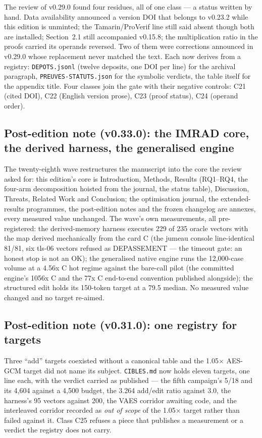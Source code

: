 \documentclass[10pt,a4paper]{article}
\newcommand{\code}[1]{\texttt{\small #1}}
\begin{document}
The review of v0.29.0 found four residues, all of one class --- a status written by hand. Data
availability announced a version DOI that belongs to v0.23.2 while this edition is unminted; the
Tamarin/ProVerif line still said absent though both are installed; Section~2.1 still accompanied
v0.15.8; the multiplication ratio in the proofs carried its operands reversed. Two of them were
corrections announced in v0.29.0 whose replacement never matched the text. Each now derives from
a registry: \code{DEPOTS.jsonl} (twelve deposits, one DOI per line) for the archival paragraph,
\code{PREUVES-STATUTS.json} for the symbolic verdicts, the table itself for the appendix title.
Four classes join the gate with their negative controls: C21 (cited DOI), C22 (English version
prose), C23 (proof status), C24 (operand order).


\subsection{Post-edition note (v0.33.0): the IMRAD core, the derived
harness, the generalised engine}
The twenty-eighth wave restructures the manuscript into the core the
review asked for: this edition's core is Introduction, Methods, Results
(RQ1--RQ4, the four-arm decomposition hoisted from the journal, the
status table), Discussion, Threats, Related Work and Conclusion; the
optimisation journal, the extended-results programmes, the post-edition
notes and the frozen changelog are annexes, every measured value
unchanged. The wave's own measurements, all pre-registered: the
derived-memory harness executes 229 of 235 oracle vectors with the map
derived mechanically from the card C (the jumeau console line-identical
81/81, six tls-06 vectors refused as DEPASSEMENT --- the timeout gate:
an honest stop is not an OK); the generalised native engine runs the
12,000-case volume at a 4.56x C hot regime against the bare-call pilot
(the committed engine's 1056x C and the 77x C end-to-end convention
published alongside); the structured edit holds its 150-token target at
a 79.5 median. No measured value changed and no target re-aimed.

\subsection{Post-edition note (v0.31.0): one registry for targets}

Three ``add'' targets coexisted without a canonical table and the 1.05$\times$ AES-GCM target did
not name its subject. \code{CIBLES.md} now holds eleven targets, one line each, with the verdict
carried as published --- the fifth campaign's 5/18 and its 4{,}604 against a 4{,}500 budget, the
3.264 add/edit ratio against 3.0, the harness's 95 vectors against 200, the VAES corridor
awaiting code, and the interleaved corridor recorded as \emph{out of scope} of the 1.05$\times$
target rather than failed against it. Class C25 refuses a piece that publishes a measurement or a
verdict the registry does not carry.
\end{document}
